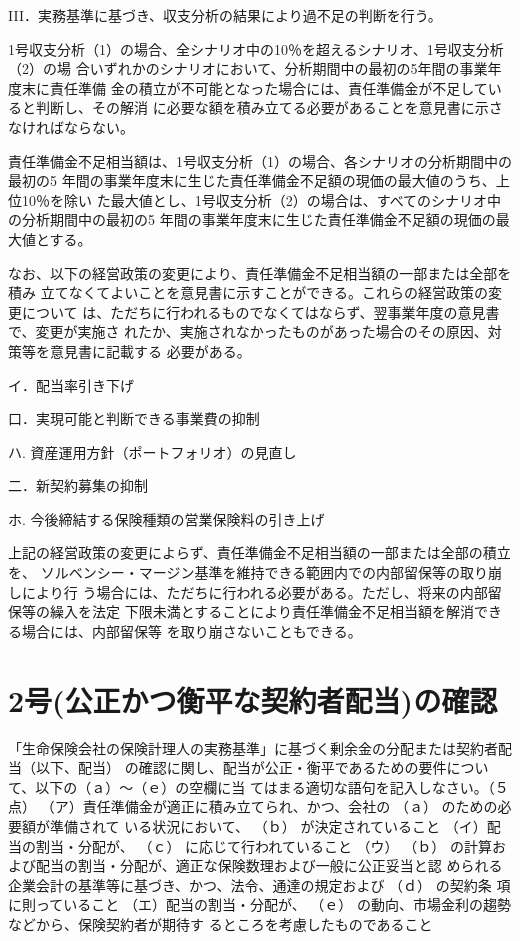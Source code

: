 \documentclass[report,gutter=10mm,fore-edge=10mm,uplatex,dvipdfmx]{jlreq}
\begin{document}
III．実務基準に基づき、収支分析の結果により過不足の判断を行う。

1号収支分析（1）の場合、全シナリオ中の10％を超えるシナリオ、1号収支分析（2）の場
合いずれかのシナリオにおいて、分析期間中の最初の5年間の事業年度末に責任準備
金の積立が不可能となった場合には、責任準備金が不足していると判断し、その解消
に必要な額を積み立てる必要があることを意見書に示さなければならない。

責任準備金不足相当額は、1号収支分析（1）の場合、各シナリオの分析期間中の最初の5
年間の事業年度末に生じた責任準備金不足額の現価の最大値のうち、上位10％を除い
た最大値とし、1号収支分析（2）の場合は、すべてのシナリオ中の分析期間中の最初の5
年間の事業年度末に生じた責任準備金不足額の現価の最大値とする。

なお、以下の経営政策の変更により、責任準備金不足相当額の一部または全部を積み
立てなくてよいことを意見書に示すことができる。これらの経営政策の変更について
は、ただちに行われるものでなくてはならず、翌事業年度の意見書で、変更が実施さ
れたか、実施されなかったものがあった場合のその原因、対策等を意見書に記載する
必要がある。

イ．配当率引き下げ

口．実現可能と判断できる事業費の抑制

ハ. 資産運用方針（ポートフォリオ）の見直し

二．新契約募集の抑制

ホ. 今後締結する保険種類の営業保険料の引き上げ

上記の経営政策の変更によらず、責任準備金不足相当額の一部または全部の積立を、
ソルベンシー・マージン基準を維持できる範囲内での内部留保等の取り崩しにより行
う場合には、ただちに行われる必要がある。ただし、将来の内部留保等の繰入を法定
下限未満とすることにより責任準備金不足相当額を解消できる場合には、内部留保等
を取り崩さないこともできる。


\section{2号(公正かつ衡平な契約者配当)の確認}


「生命保険会社の保険計理人の実務基準」に基づく剰余金の分配または契約者配当（以下、配当）
の確認に関し、配当が公正・衡平であるための要件について、以下の（ａ）～（ｅ）の空欄に当
てはまる適切な語句を記入しなさい。（５点）
（ア）責任準備金が適正に積み立てられ、かつ、会社の （ａ） のための必要額が準備されて
いる状況において、 （ｂ） が決定されていること
（イ）配当の割当・分配が、 （ｃ） に応じて行われていること
（ウ） （ｂ） の計算および配当の割当・分配が、適正な保険数理および一般に公正妥当と認
められる企業会計の基準等に基づき、かつ、法令、通達の規定および （ｄ） の契約条
項に則っていること
（エ）配当の割当・分配が、 （ｅ） の動向、市場金利の趨勢などから、保険契約者が期待す
るところを考慮したものであること
\end{document}
